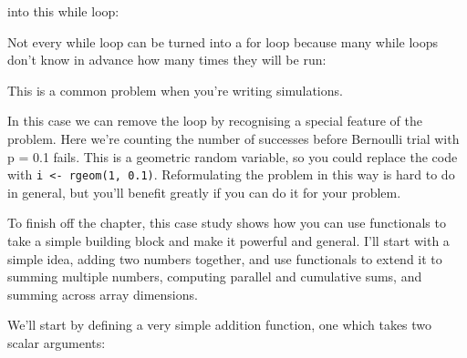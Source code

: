 into this while loop:

\begin{Shaded}
\begin{Highlighting}[]
\StringTok{ }
\StringTok{ }\NormalTok{) \{}
  \StringTok{ }\StringTok{ }
\NormalTok{\}}
\end{Highlighting}
\end{Shaded}

Not every while loop can be turned into a for loop because many while
loops don't know in advance how many times they will be run:

\begin{Shaded}
\begin{Highlighting}[]
\StringTok{ }
\NormalTok{) \{}
  \NormalTok{(}\NormalTok{) >}\StringTok{ }
  \StringTok{ }\StringTok{ }
\NormalTok{\}}
\end{Highlighting}
\end{Shaded}

This is a common problem when you're writing simulations.

In this case we can remove the loop by recognising a special feature of
the problem. Here we're counting the number of successes before
Bernoulli trial with p = 0.1 fails. This is a geometric random variable,
so you could replace the code with
\texttt{i \textless{}- rgeom(1, 0.1)}. Reformulating the problem in this
way is hard to do in general, but you'll benefit greatly if you can do
it for your problem.


To finish off the chapter, this case study shows how you can use
functionals to take a simple building block and make it powerful and
general. I'll start with a simple idea, adding two numbers together, and
use functionals to extend it to summing multiple numbers, computing
parallel and cumulative sums, and summing across array dimensions.

We'll start by defining a very simple addition function, one which takes
two scalar arguments:


